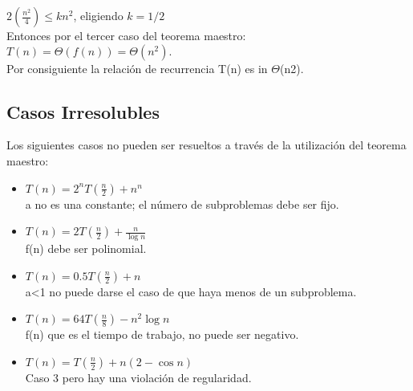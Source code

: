 \documentclass{article} %
\begin{document}
${\displaystyle 2({\frac {n^{2}}{4}})\leq kn^{2}}$, eligiendo ${\displaystyle k=1/2}$\\
Entonces por el tercer caso del teorema maestro:\\

${\displaystyle T\left(n\right)=\Theta \left(f(n)\right)=\Theta \left(n^{2}\right).}$\\
Por consiguiente la relación de recurrencia T(n) es in $\Theta$(n2).\\

\subsection{Casos Irresolubles}
Los siguientes casos no pueden ser resueltos a través de la utilización del teorema maestro:\\

\begin{itemize}
    \item ${\displaystyle T(n)=2^{n}T\left({\frac {n}{2}}\right)+n^{n}}$\\
a no es una constante; el número de subproblemas debe ser fijo.
    \item ${\displaystyle T(n)=2T\left({\frac {n}{2}}\right)+{\frac {n}{\log n}}}$\\
f(n) debe ser polinomial.
    \item ${\displaystyle T(n)=0.5T\left({\frac {n}{2}}\right)+n}$\\
a<1 no puede darse el caso de que haya menos de un subproblema.
    \item ${\displaystyle T(n)=64T\left({\frac {n}{8}}\right)-n^{2}\log n}$\\
f(n) que es el tiempo de trabajo, no puede ser negativo.
    \item ${\displaystyle T(n)=T\left({\frac {n}{2}}\right)+n(2-\cos n)}$\\
Caso 3 pero hay una violación de regularidad.
\end{itemize}







\printbibliography[title={Bibliografía}]
\end{document}
